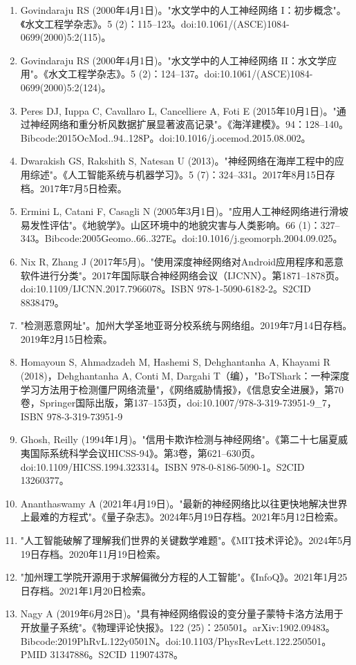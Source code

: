 \begin{enumerate}
\item Govindaraju RS (2000年4月1日)。"水文学中的人工神经网络 I：初步概念"。《水文工程学杂志》。5 (2)：115–123。doi:10.1061/(ASCE)1084-0699(2000)5:2(115)。
\item Govindaraju RS (2000年4月1日)。"水文学中的人工神经网络 II：水文学应用"。《水文工程学杂志》。5 (2)：124–137。doi:10.1061/(ASCE)1084-0699(2000)5:2(124)。
\item Peres DJ, Iuppa C, Cavallaro L, Cancelliere A, Foti E (2015年10月1日)。"通过神经网络和重分析风数据扩展显著波高记录"。《海洋建模》。94：128–140。Bibcode:2015OcMod..94..128P。doi:10.1016/j.ocemod.2015.08.002。
\item Dwarakish GS, Rakshith S, Natesan U (2013)。"神经网络在海岸工程中的应用综述"。《人工智能系统与机器学习》。5 (7)：324–331。2017年8月15日存档。2017年7月5日检索。
\item Ermini L, Catani F, Casagli N (2005年3月1日)。"应用人工神经网络进行滑坡易发性评估"。《地貌学》。山区环境中的地貌灾害与人类影响。66 (1)：327–343。Bibcode:2005Geomo..66..327E。doi:10.1016/j.geomorph.2004.09.025。
\item Nix R, Zhang J (2017年5月)。"使用深度神经网络对Android应用程序和恶意软件进行分类"。2017年国际联合神经网络会议（IJCNN）。第1871–1878页。doi:10.1109/IJCNN.2017.7966078。ISBN 978-1-5090-6182-2。S2CID 8838479。
\item "检测恶意网址"。加州大学圣地亚哥分校系统与网络组。2019年7月14日存档。2019年2月15日检索。
\item Homayoun S, Ahmadzadeh M, Hashemi S, Dehghantanha A, Khayami R (2018)，Dehghantanha A, Conti M, Dargahi T（编），"BoTShark：一种深度学习方法用于检测僵尸网络流量"，《网络威胁情报》，《信息安全进展》，第70卷，Springer国际出版，第137–153页，doi:10.1007/978-3-319-73951-9_7，ISBN 978-3-319-73951-9
\item Ghosh, Reilly (1994年1月)。"信用卡欺诈检测与神经网络"。《第二十七届夏威夷国际系统科学会议HICSS-94》。第3卷，第621–630页。doi:10.1109/HICSS.1994.323314。ISBN 978-0-8186-5090-1。S2CID 13260377。
\item Ananthaswamy A (2021年4月19日)。"最新的神经网络比以往更快地解决世界上最难的方程式"。《量子杂志》。2024年5月19日存档。2021年5月12日检索。
\item "人工智能破解了理解我们世界的关键数学难题"。《MIT技术评论》。2024年5月19日存档。2020年11月19日检索。
\item "加州理工学院开源用于求解偏微分方程的人工智能"。《InfoQ》。2021年1月25日存档。2021年1月20日检索。
\item Nagy A (2019年6月28日)。"具有神经网络假设的变分量子蒙特卡洛方法用于开放量子系统"。《物理评论快报》。122 (25)：250501。arXiv:1902.09483。Bibcode:2019PhRvL.122y0501N。doi:10.1103/PhysRevLett.122.250501。PMID 31347886。S2CID 119074378。

\end{enumerate}
